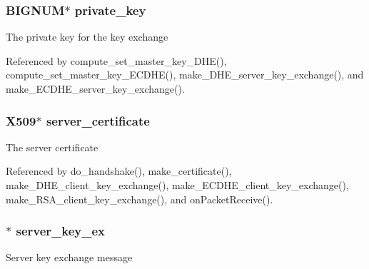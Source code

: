 \subsubsection[{\texorpdfstring{private\+\_\+key}{private_key}}]{\setlength{\rightskip}{0pt plus 5cm}B\+I\+G\+N\+UM$\ast$ private\+\_\+key}\hypertarget{struct_t_l_s__parameters__t_aa7d109714bb4c1faa6aba18c0dd3dcae}{}\label{struct_t_l_s__parameters__t_aa7d109714bb4c1faa6aba18c0dd3dcae}
The private key for the key exchange 

Referenced by compute\+\_\+set\+\_\+master\+\_\+key\+\_\+\+D\+H\+E(), compute\+\_\+set\+\_\+master\+\_\+key\+\_\+\+E\+C\+D\+H\+E(), make\+\_\+\+D\+H\+E\+\_\+server\+\_\+key\+\_\+exchange(), and make\+\_\+\+E\+C\+D\+H\+E\+\_\+server\+\_\+key\+\_\+exchange().

\subsubsection[{\texorpdfstring{server\+\_\+certificate}{server_certificate}}]{\setlength{\rightskip}{0pt plus 5cm}X509$\ast$ server\+\_\+certificate}\hypertarget{struct_t_l_s__parameters__t_a832ae425d6bb6330e1e5e825ab85ac31}{}\label{struct_t_l_s__parameters__t_a832ae425d6bb6330e1e5e825ab85ac31}
The server certificate 

Referenced by do\+\_\+handshake(), make\+\_\+certificate(), make\+\_\+\+D\+H\+E\+\_\+client\+\_\+key\+\_\+exchange(), make\+\_\+\+E\+C\+D\+H\+E\+\_\+client\+\_\+key\+\_\+exchange(), make\+\_\+\+R\+S\+A\+\_\+client\+\_\+key\+\_\+exchange(), and on\+Packet\+Receive().

\subsubsection[{\texorpdfstring{server\+\_\+key\+\_\+ex}{server_key_ex}}]{$\ast$ server\+\_\+key\+\_\+ex}\hypertarget{struct_t_l_s__parameters__t_ad79527a4a6a3547cc16f0fb569767d9d}{}\label{struct_t_l_s__parameters__t_ad79527a4a6a3547cc16f0fb569767d9d}
Server key exchange message 

